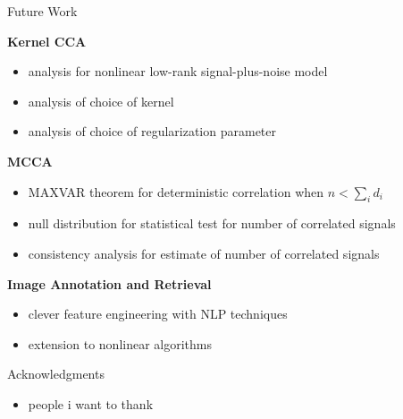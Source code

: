 \documentclass[8pt]{beamer}
\begin{document}
\begin{frame}{Future Work}


\textbf{Kernel CCA}
\begin{itemize}
\item analysis for nonlinear low-rank signal-plus-noise model
\item analysis of choice of kernel
\item analysis of choice of regularization parameter
\end{itemize}

\vspace{2ex}

\textbf{MCCA}
\begin{itemize}
\item MAXVAR theorem for deterministic correlation when $n<\sum_i d_i$ 
\item null distribution for statistical test for number of correlated signals
\item consistency analysis for estimate of number of correlated signals
\end{itemize}

\vspace{2ex}

\textbf{Image Annotation and Retrieval}
\begin{itemize}
\item clever feature engineering with NLP techniques 
\item extension to nonlinear algorithms
\end{itemize}



\end{frame}

\begin{frame}{Acknowledgments}

\begin{itemize}
\item people i want to thank
\end{itemize}

\end{frame}
\end{document}
